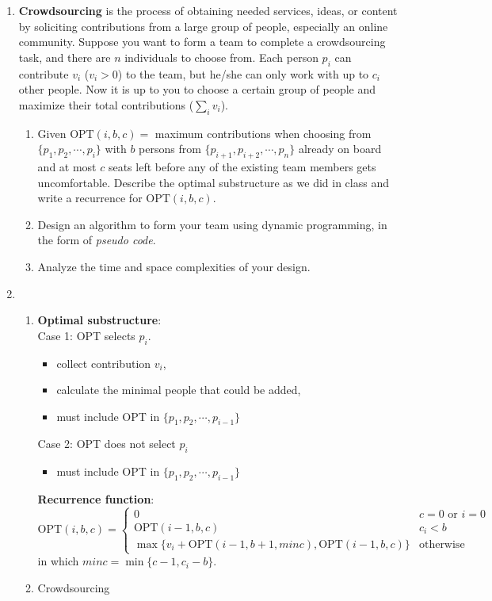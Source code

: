\documentclass[12pt,a4paper]{article}
\makeatletter
\newtheorem*{solution}{Solution}
\theoremstyle{definition}
\renewenvironment{solution}[1][Solution] {\par\pushQED{\qed}\normalfont\topsep6\p@\@plus6\p@\relax\trivlist\item[\hskip\labelsep\bfseries#1\@addpunct{.}]\ignorespaces}{\popQED\endtrivlist\@endpefalse} \makeatother
\makeatother
\begin{document}
\begin{enumerate}
	\item
	\textbf{Crowdsourcing} is the process of obtaining needed services, ideas, or content by soliciting contributions from a large group of people, especially an online community. Suppose you want to form a team to complete a crowdsourcing task, and there are $n$ individuals to choose from. Each person $p_i$ can contribute $v_i$ ($v_i > 0$) to the team, but he/she can only work with up to $c_i$ other people. Now it is up to you to choose a certain group of people and maximize their total contributions ($\sum_i{v_i}$).
	
	\begin{enumerate}
		\item Given $\text{OPT}(i, b, c)=$ maximum contributions when choosing from $\{p_1, p_2, \cdots, p_i\}$ with $b$ persons from $\{p_{i+1}, p_{i+2}, \cdots, p_n\}$ already on board and at most $c$ seats left before any of the existing team members gets uncomfortable. Describe the optimal substructure as we did in class and write a recurrence for $\text{OPT}(i, b, c)$.
		\item Design an algorithm to form your team using dynamic programming, in the form of \emph{pseudo code}.
        \item Analyze the time and space complexities of your design.
	\end{enumerate}

	\begin{solution}
		\begin{enumerate}
			\item \textbf{Optimal substructure}:\\
			Case 1: OPT selects $ p_i $.
			\begin{itemize}
				\item collect contribution $ v_i $, 
				\item calculate the minimal people that could be added,
				\item must include OPT in $ \{p_1, p_2, \cdots, p_{i-1}\} $
			\end{itemize}
			Case 2: OPT does not select $ p_i $
			\begin{itemize}
				\item must include OPT in $ \{p_1, p_2, \cdots, p_{i-1}\} $
			\end{itemize}
			\textbf{Recurrence function}:
			$$\text{OPT}(i, b, c)= 
			\begin{cases}
			0 &c=0\text{ or }i=0\\
			\text{OPT}(i-1,b,c) &c_i<b\\
			\max \{v_i+\text{OPT}(i-1,b+1,minc),\text{OPT}(i-1,b,c)\} &\text{otherwise}
			\end{cases}
			$$
			in which $ minc=\min\{c-1,c_i-b\} $.
			\item
			\begin{minipage}[t]{0.89\textwidth}
				\begin{algorithm}[H]
					\BlankLine
					\caption{Crowdsourcing}
					\label{Alg-3}
					

\end{algorithm}
\end{minipage}
\end{enumerate}
\end{solution}
\end{enumerate}
\end{document}
